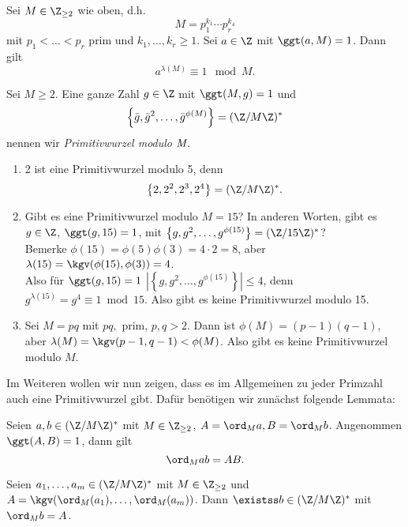 \begin{thm}\autolabel
	Sei $M \in \Z_{\geq 2}$ wie oben, d.h.
	\[ M = p_1^{k_1} \dotsm p_r^{k_4} \]
	mit $p_1 < \dots < p_r$ prim und $k_1, \dotsc, k_r \geq 1$. Sei $a \in \Z$ mit $\ggt(a,M)=1$. Dann gilt
	\[ a^{\lambda(M)} \equiv 1 \mod M. \]
\end{thm}

\begin{defn*}[Primitivwurzel]
	Sei $M \geq 2$. Eine ganze Zahl $g \in \Z$ mit $\ggt(M,g)=1$ und 
	\[ \left\{ \bar{g}, \bar{g}^2,\dotsc, \bar{g}^{\phi(M)} \right\} = (\Z/M\Z)^* \]
	nennen wir \emph{Primitivwurzel modulo $\emph{M}$}.
\end{defn*}

\begin{exmp*}
	\begin{enumerate}
		\item 2 ist eine Primitivwurzel modulo 5, denn
		\[ \left\{2,2^2,2^3,2^4 \right\} = (\Z/M\Z)^*. \]
		\item Gibt es eine Primitivwurzel modulo $M=15$? In anderen Worten, gibt es $g \in \Z$, $\ggt(g,15)=1$, mit $\left\{ g,g^2,\dotsc,g^{\phi(15)} \right\} = (\Z/15\Z)^*$?\\
			Bemerke $\phi(15) = \phi(5)\phi(3) = 4 \cdot 2 = 8$, aber $\lambda(15) = \kgv(\phi(15),\phi(3)) = 4$.\\
			Also für $\ggt(g,15) = 1$ $\left|\left\{ g,g^2,\dotsc, g^{\phi(15)} \right\}\right| \leq 4$, denn $g^{\lambda(15)} = g^4 \equiv 1 \bmod 15$. Also gibt es keine Primitivwurzel modulo 15.
		\item Sei $M = pq$ mit $pq,$ prim, $p,q > 2$. Dann ist $\phi(M) = (p-1)(q-1)$, aber $\lambda(M) = \kgv(p-1,q-1) < \phi(M)$. Also gibt es keine Primitivwurzel modulo $M$.
	\end{enumerate}
\end{exmp*}

Im Weiteren wollen wir nun zeigen, dass es im Allgemeinen zu jeder Primzahl auch eine Primitivwurzel gibt. Dafür benötigen wir zunächst folgende Lemmata:

\begin{lem}\autolabel
	Seien $a,b \in (\Z/M\Z)^*$ mit $M \in \Z_{\geq 2}$, $A = \ord_M a, B = \ord_M b$. Angenommen $\ggt(A,B)=1$, dann gilt
	\[ \ord_M ab = AB. \]
\end{lem}

\begin{lem}\autolabel
	Seien $a_1,\dotsc,a_m \in (\Z/M\Z)^*$ mit $M \in \Z_{\geq 2}$ und $A = \kgv(\ord_M(a_1),\dotsc, \ord_M(a_m))$. Dann $\existss b \in (\Z/M\Z)^*$ mit $\ord_M b = A$.
\end{lem}

